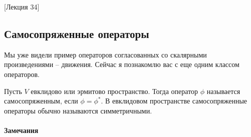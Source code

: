 [Лекция 34]


\subsection{Самосопряженные операторы}

Мы уже видели пример операторов согласованных со скалярными произведениями -- движения.
Сейчас я познакомлю вас с еще одним классом операторов.

\begin{definition}
Пусть $V$ евклидово или эрмитово пространство.
Тогда оператор $\phi$ называется самосопряженным, если $\phi = \phi^*$.
В евклидовом пространстве самосопряженные операторы обычно называются симметричными.
\end{definition}

\paragraph{Замечания}

